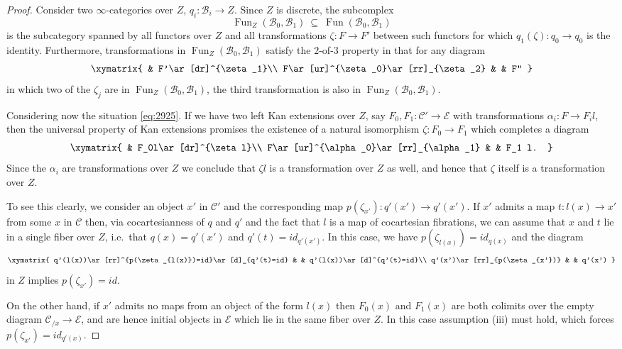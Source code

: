 \documentclass[reqno]{amsart}
\theoremstyle{definition}
\newcommand{\msc}[1]{\mathscr{#1}}
\DeclareMathOperator{\Fun}{Fun}
\renewcommand{\1}{\mathbf{1}}
\begin{document}
\begin{proof}
Consider two $\infty$-categories over $Z$, $q_i:\msc{B}_i\to Z$. Since $Z$ is discrete, the subcomplex
\[
\Fun_{Z}(\msc{B}_0,\msc{B}_1)\ \subseteq\ \Fun(\msc{B}_0,\msc{B}_1)
\]
is the subcategory spanned by all functors over $Z$ and all transformations $\zeta:F\to F'$ between such functors for which $q_1(\zeta):q_0\to q_0$ is the identity.  Furthermore, transformations in $\Fun_{Z}(\msc{B}_0,\msc{B}_1)$ satisfy the $2$-of-$3$ property in that for any diagram
\[
\xymatrix{
	& F'\ar[dr]^{\zeta_1}\\
F\ar[ur]^{\zeta_0}\ar[rr]_{\zeta_2} & & F''
}
\]
in which two of the $\zeta_j$ are in $\Fun_Z(\msc{B}_0,\msc{B}_1)$, the third transformation is also in $\Fun_Z(\msc{B}_0,\msc{B}_1)$.
\par

Considering now the situation \eqref{eq:2925}. If we have two left Kan extensions over $Z$, say $F_0,F_1:\msc{C}'\to \msc{E}$ with transformations $\alpha_i:F\to F_il$, then the universal property of Kan extensions promises the existence of a natural isomorphism $\zeta:F_0\to F_1$ which completes a diagram
\[
\xymatrix{
	& F_0l\ar[dr]^{\zeta l}\\
F\ar[ur]^{\alpha_0}\ar[rr]_{\alpha_1} & & F_1 l.
}
\]
Since the $\alpha_i$ are transformations over $Z$ we conclude that $\zeta l$ is a transformation over $Z$ as well, and hence that $\zeta$ itself is a transformation over $Z$.
\par

To see this clearly, we consider an object $x'$ in $\msc{C}'$ and the corresponding map $p(\zeta_{x'}):q'(x')\to q'(x')$.  If $x'$ admits a map $t:l(x)\to x'$ from some $x$ in $\msc{C}$ then, via cocartesianness of $q$ and $q'$ and the fact that $l$ is a map of cocartesian fibrations, we can assume that $x$ and $t$ lie in a single fiber over $Z$, i.e.\ that $q(x)=q'(x')$ and $q'(t)=id_{q'(x')}$.  In this case, we have $p(\zeta_{l(x)})=id_{q(x)}$ and the diagram
\[
\xymatrix{
q'(l(x))\ar[rr]^{p(\zeta_{l(x)})=id}\ar[d]_{q'(t)=id} & & q'(l(x))\ar[d]^{q'(t)=id}\\
q'(x')\ar[rr]_{p(\zeta_{x'})} & & q'(x')
}
\]
in $Z$ implies $p(\zeta_{x'})=id$.
\par

On the other hand, if $x'$ admits no maps from an object of the form $l(x)$ then $F_0(x)$ and $F_1(x)$ are both colimits over the empty diagram $\msc{C}_{/x}\to \msc{E}$, and are hence initial objects in $\msc{E}$ which lie in the same fiber over $Z$.  In this case assumption (iii) must hold, which forces $p(\zeta_{x'})=id_{q'(x)}$.
\par


\end{proof}
\end{document}

